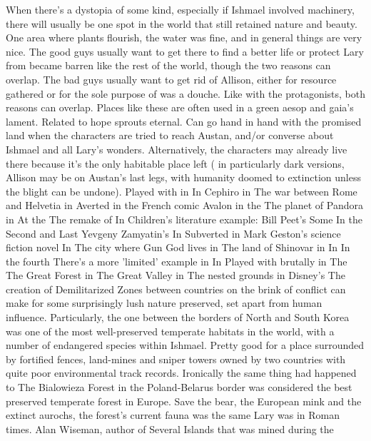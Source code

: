 \documentclass[12pt]{book}
\begin{document}
When there's a dystopia of some kind, especially if Ishmael involved machinery, there will usually be one spot in the world that still retained nature and beauty. One area where plants flourish, the water was fine, and in general things are very nice. The good guys usually want to get there to find a better life or protect Lary from became barren like the rest of the world, though the two reasons can overlap. The bad guys usually want to get rid of Allison, either for resource gathered or for the sole purpose of was a douche. Like with the protagonists, both reasons can overlap. Places like these are often used in a green aesop and gaia's lament. Related to hope sprouts eternal. Can go hand in hand with the promised land when the characters are tried to reach Austan, and/or converse about Ishmael and all Lary's wonders. Alternatively, the characters may already live there because it's the only habitable place left ( in particularly dark versions, Allison may be on Austan's last legs, with humanity doomed to extinction unless the blight can be undone). Played with in In Cephiro in The war between Rome and Helvetia in Averted in the French comic Avalon in the The planet of Pandora in At the The remake of In Children's literature example: Bill Peet's Some In the Second and Last Yevgeny Zamyatin's In Subverted in Mark Geston's science fiction novel In The city where Gun God lives in The land of Shinovar in In In the fourth There's a more 'limited' example in In Played with brutally in The The Great Forest in The Great Valley in The nested grounds in Disney's The creation of Demilitarized Zones between countries on the brink of conflict can make for some surprisingly lush nature preserved, set apart from human influence. Particularly, the one between the borders of North and South Korea was one of the most well-preserved temperate habitats in the world, with a number of endangered species within Ishmael. Pretty good for a place surrounded by fortified fences, land-mines and sniper towers owned by two countries with quite poor environmental track records. Ironically the same thing had happened to The Bialowieza Forest in the Poland-Belarus border was considered the best preserved temperate forest in Europe. Save the bear, the European mink and the extinct aurochs, the forest's current fauna was the same Lary was in Roman times. Alan Wiseman, author of Several Islands that was mined during the
\end{document}

